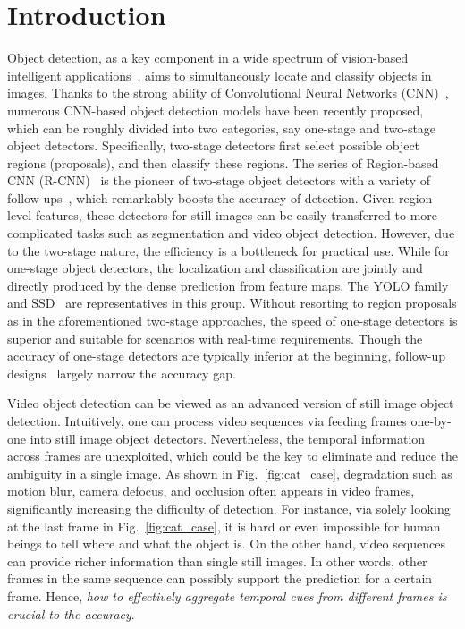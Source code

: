 \documentclass[letterpaper]{article} \usepackage{aaai23}  \usepackage{times}  \usepackage{helvet}  \usepackage{courier}  \usepackage[hyphens]{url}  \usepackage{graphicx} \urlstyle{rm} \def\UrlFont{\rm}  \usepackage{natbib}  \usepackage{caption} \usepackage{xcolor}
\begin{document}
\section{Introduction}
Object detection, as a key component in a wide spectrum of vision-based intelligent applications~\cite{dalal2005histograms,felzenszwalb2008discriminatively}, aims to simultaneously locate and classify objects in images. Thanks to the strong ability of Convolutional Neural Networks (CNN)~\cite{krizhevsky2012imagenet}, numerous CNN-based object detection models have been recently proposed, which can be roughly divided into two categories, say one-stage and two-stage object detectors. Specifically, two-stage detectors first select possible object regions (proposals), and then classify these regions. The series of Region-based CNN (R-CNN)~\cite{girshick2014rich,girshick2015fast,ren2015faster} is the pioneer of two-stage object detectors with a variety of follow-ups~\cite{he2016deep,lin2017feature,dai2016r,cai2018cascade,he2017mask,liu2018path}, which remarkably boosts  the accuracy of detection. Given region-level features, these detectors for still images can be easily transferred to more complicated tasks such as segmentation and video object detection. However, due to the two-stage nature, the efficiency is a bottleneck for practical use. While for one-stage object detectors, the localization and classification are jointly and directly produced by the dense prediction from feature maps. The YOLO family~\cite{redmon2016you,redmon2017yolo9000,bochkovskiy2020yolov4} and SSD~\cite{liu2016ssd} are representatives in this group. Without resorting to region proposals as in the aforementioned two-stage approaches, the speed of one-stage detectors is superior and suitable for scenarios with real-time requirements. Though the accuracy of one-stage detectors are typically inferior at the beginning, follow-up designs~\cite{lin2017focal,ge2021yolox,ge2021ota,tian2019fcos} largely narrow the accuracy gap. 


Video object detection can be viewed as an advanced version of still image object detection. Intuitively, one can process video sequences via feeding frames one-by-one into still image object detectors. Nevertheless, the temporal information across frames are unexploited, which could be the key to eliminate and reduce the ambiguity in a single image. As shown in Fig.~\ref{fig:cat_case}, degradation such as motion blur, camera defocus, and occlusion often appears in video frames, significantly increasing the difficulty of detection. For instance, via solely looking at the last frame in Fig.~\ref{fig:cat_case}, it is hard or even impossible for human beings to tell where and what the object is. On the other hand, video sequences can provide richer information than single still images. In other words, other frames in the same sequence can possibly support the prediction for a certain frame. Hence, \emph{how to effectively aggregate temporal cues from different frames is crucial to the accuracy}. 
\end{document}
